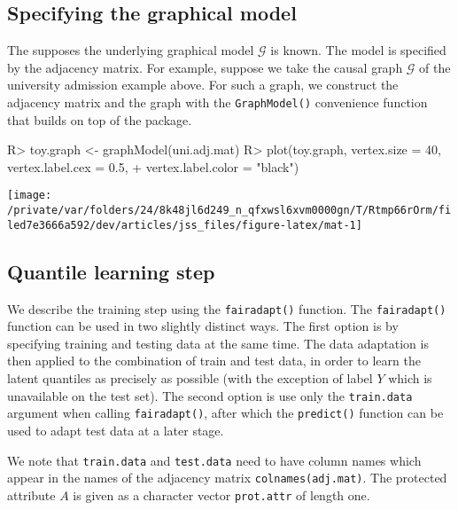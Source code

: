 \documentclass[
  notitle]{jss}
\begin{document}
\hypertarget{specifying-the-graphical-model}{%
\subsection{Specifying the graphical
model}\label{specifying-the-graphical-model}}

The  supposes the underlying graphical model
\(\mathcal{G}\) is known. The model is specified by the adjacency
matrix. For example, suppose we take the causal graph \(\mathcal{G}\) of
the university admission example above. For such a graph, we construct
the adjacency matrix and the graph with the \texttt{GraphModel()}
convenience function that builds on top of the  package.

\begin{CodeChunk}
\begin{CodeInput}
R> toy.graph <- graphModel(uni.adj.mat)
R> plot(toy.graph, vertex.size = 40, vertex.label.cex = 0.5,
+   vertex.label.color = "black")
\end{CodeInput}


\begin{center}\texttt{[image: /private/var/folders/24/8k48jl6d249\_n\_qfxwsl6xvm0000gn/T/Rtmp66rOrm/filed7e3666a592/dev/articles/jss\_files/figure-latex/mat-1]} \end{center}

\end{CodeChunk}

\hypertarget{quantile-learning-step}{%
\subsection{Quantile learning step}\label{quantile-learning-step}}

We describe the training step using the \texttt{fairadapt()} function.
The \texttt{fairadapt()} function can be used in two slightly distinct
ways. The first option is by specifying training and testing data at the
same time. The data adaptation is then applied to the combination of
train and test data, in order to learn the latent quantiles as precisely
as possible (with the exception of label \(Y\) which is unavailable on
the test set). The second option is use only the \texttt{train.data}
argument when calling \texttt{fairadapt()}, after which the
\texttt{predict()} function can be used to adapt test data at a later
stage.

We note that \texttt{train.data} and \texttt{test.data} need to have
column names which appear in the names of the adjacency matrix
\texttt{colnames(adj.mat)}. The protected attribute \(A\) is given as a
character vector \texttt{prot.attr} of length one.
\end{document}
